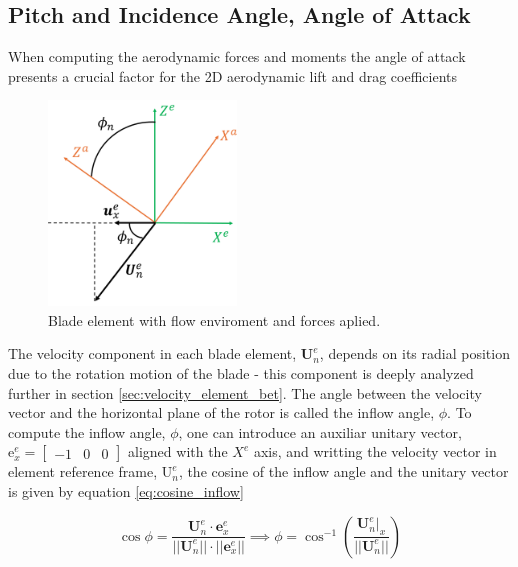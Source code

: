 \subsection{ Pitch and Incidence Angle, Angle of Attack}

When computing the aerodynamic forces and moments the angle of attack presents a crucial factor for the 2D aerodynamic lift and drag coefficients

\begin{figure}[!htb]
    \centering
    \includegraphics[width=5cm]{Figures/background/bet/phi_angle.png}
    \caption{Blade element with flow enviroment and forces aplied.}
    \label{fig:phi_angle}
\end{figure}



The velocity component in each blade element, $\mathbf{U}_n^e$,  depends on its radial position due to the rotation motion of the blade - this component is deeply analyzed further in section \ref{sec:velocity_element_bet}. The angle between the velocity vector and the horizontal plane of the rotor is called the inflow angle, $\phi$. To compute the inflow angle, $\phi$, one can introduce an auxiliar unitary vector, $\mathrm{e}^e_x = \begin{bmatrix} -1 & 0 & 0 \end{bmatrix}$ aligned with the $X^e$ axis, and writting the velocity vector in element reference frame, $\mathrm{U}_n^e$, the cosine of the inflow angle and the unitary vector is given by equation \ref{eq:cosine_inflow}



\begin{equation}
    \cos \phi = \frac{\mathbf{U}_n^e \cdot \mathbf{e}^e_x}{||\mathbf{U}_n^e|| \cdot ||\mathbf{e}_x^e||} \implies \phi = \cos^{-1} \left( \frac{\mathbf{U}_n^e|_x}{||\mathbf{U}_n^e||}\right)
    \label{eq:cosine_inflow}
\end{equation}

